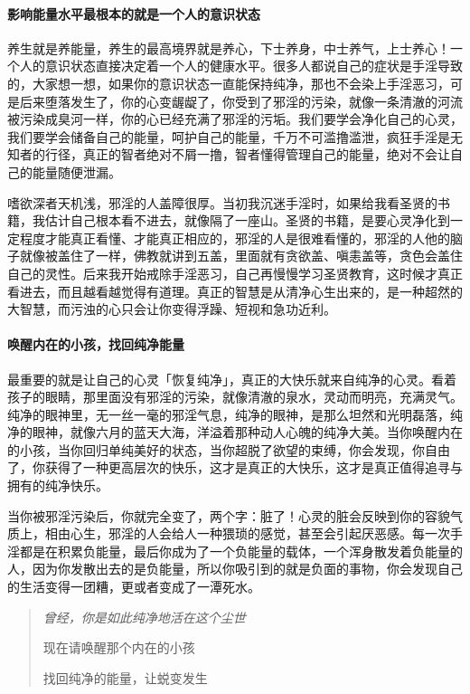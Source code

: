 \paragraph{影响能量水平最根本的就是一个人的意识状态}

养生就是养能量，养生的最高境界就是养心，下士养身，中士养气，上士养心！一个人的意识状态直接决定着一个人的健康水平。很多人都说自己的症状是手淫导致的，大家想一想，如果你的意识状态一直能保持纯净，那也不会染上手淫恶习，可是后来堕落发生了，你的心变龌龊了，你受到了邪淫的污染，就像一条清澈的河流被污染成臭河一样，你的心已经充满了邪淫的污垢。我们要学会净化自己的心灵，我们要学会储备自己的能量，呵护自己的能量，千万不可滥撸滥泄，疯狂手淫是无知者的行径，真正的智者绝对不屑一撸，智者懂得管理自己的能量，绝对不会让自己的能量随便泄漏。

嗜欲深者天机浅，邪淫的人盖障很厚。当初我沉迷手淫时，如果给我看圣贤的书籍，我估计自己根本看不进去，就像隔了一座山。圣贤的书籍，是要心灵净化到一定程度才能真正看懂、才能真正相应的，邪淫的人是很难看懂的，邪淫的人他的脑子就像被盖住了一样，佛教就讲到五盖，里面就有贪欲盖、嗔恚盖等，贪色会盖住自己的灵性。后来我开始戒除手淫恶习，自己再慢慢学习圣贤教育，这时候才真正看进去，而且越看越觉得有道理。真正的智慧是从清净心生出来的，是一种超然的大智慧，而污浊的心只会让你变得浮躁、短视和急功近利。

\paragraph{唤醒内在的小孩，找回纯净能量}

最重要的就是让自己的心灵「恢复纯净」，真正的大快乐就来自纯净的心灵。看着孩子的眼睛，那里面没有邪淫的污染，就像清澈的泉水，灵动而明亮，充满灵气。纯净的眼神里，无一丝一毫的邪淫气息，纯净的眼神，是那么坦然和光明磊落，纯净的眼神，就像六月的蓝天大海，洋溢着那种动人心魄的纯净大美。当你唤醒内在的小孩，当你回归单纯美好的状态，当你超脱了欲望的束缚，你会发现，你自由了，你获得了一种更高层次的快乐，这才是真正的大快乐，这才是真正值得追寻与拥有的纯净快乐。

当你被邪淫污染后，你就完全变了，两个字：脏了！心灵的脏会反映到你的容貌气质上，相由心生，邪淫的人会给人一种猥琐的感觉，甚至会引起厌恶感。每一次手淫都是在积累负能量，最后你成为了一个负能量的载体，一个浑身散发着负能量的人，因为你发散出去的是负能量，所以你吸引到的就是负面的事物，你会发现自己的生活变得一团糟，更或者变成了一潭死水。

\begin{quotation}\it
    曾经，你是如此纯净地活在这个尘世

    现在请唤醒那个内在的小孩

    找回纯净的能量，让蜕变发生
\end{quotation}

